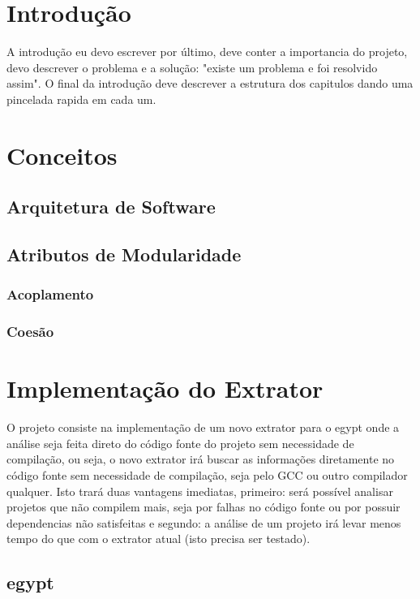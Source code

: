 \chapter{Introdução}

A introdução eu devo escrever por último, deve conter a importancia do projeto, devo descrever o problema e a solução: "existe um problema e foi resolvido assim". O final da introdução deve descrever a estrutura dos capitulos dando uma pincelada rapida em cada um.

\chapter{Conceitos}
\section{Arquitetura de Software}
\section{Atributos de Modularidade}
\subsection{Acoplamento}
\subsection{Coesão}

\chapter{Implementação do Extrator}

O projeto consiste na implementação de um novo extrator para o egypt onde a análise seja feita direto do código fonte do projeto sem necessidade de compilação, ou seja, o novo extrator irá buscar as informações diretamente no código fonte sem necessidade de compilação, seja pelo GCC ou outro compilador qualquer. Isto trará duas vantagens imediatas, primeiro: será possível analisar projetos que não compilem mais, seja por falhas no código fonte ou por possuir dependencias não satisfeitas e segundo: a análise de um projeto irá levar menos tempo do que com o extrator atual (isto precisa ser testado).

\section{egypt}

